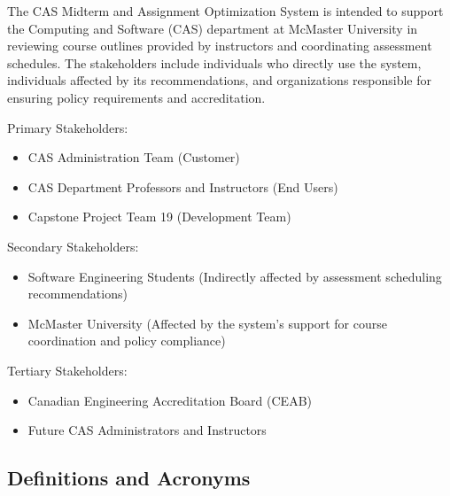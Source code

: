 \documentclass[12pt]{article}
\begin{document}
The CAS Midterm and Assignment Optimization System is intended to support the Computing and Software (CAS) 
department at McMaster University in reviewing course outlines provided by instructors and coordinating 
assessment schedules. The stakeholders include individuals who directly use the system, individuals 
affected by its recommendations, and organizations responsible for ensuring policy requirements and accreditation.


\bigskip
Primary Stakeholders:
\begin{itemize}
  \item CAS Administration Team (Customer)
  \item CAS Department Professors and Instructors (End Users)
  \item Capstone Project Team 19 (Development Team)
\end{itemize}
\bigskip
Secondary Stakeholders:
\begin{itemize}
  \item Software Engineering Students (Indirectly affected by assessment scheduling recommendations)
  \item McMaster University (Affected by the system's support for course coordination and policy compliance)
\end{itemize}
\bigskip
Tertiary Stakeholders:
\begin{itemize}
  \item Canadian Engineering Accreditation Board (CEAB)
  \item Future CAS Administrators and Instructors
\end{itemize}


\subsection{Definitions and Acronyms}
\end{document}
